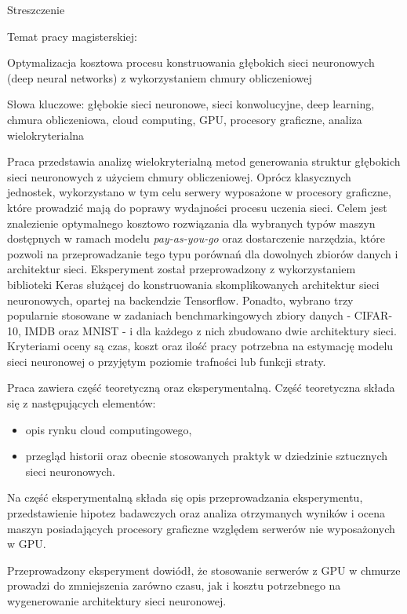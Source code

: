 \documentclass[12pt,a4paper,twoside]{article}
\begin{document}
\begin{center}

  {\Large Streszczenie}

  \vspace{1cm}
  {\large Temat pracy magisterskiej:}

  {\Large Optymalizacja kosztowa procesu konstruowania głębokich sieci neuronowych (deep neural networks) z wykorzystaniem chmury obliczeniowej}

  Słowa kluczowe:
  głębokie sieci neuronowe, sieci konwolucyjne, deep learning, chmura obliczeniowa, cloud computing, GPU, procesory graficzne, analiza wielokryterialna

  \end{center}
  \noindent
  Praca przedstawia analizę wielokryterialną metod generowania struktur głębokich sieci neuronowych z użyciem chmury obliczeniowej. Oprócz klasycznych jednostek, wykorzystano w tym celu serwery wyposażone w procesory graficzne, które prowadzić mają do poprawy wydajności procesu uczenia sieci. Celem jest znalezienie optymalnego kosztowo rozwiązania dla wybranych typów maszyn dostępnych w ramach modelu \textit{pay-as-you-go} oraz dostarczenie narzędzia, które pozwoli na przeprowadzanie tego typu porównań dla dowolnych zbiorów danych i architektur sieci. Eksperyment został przeprowadzony z wykorzystaniem biblioteki Keras służącej do konstruowania skomplikowanych architektur sieci neuronowych, opartej na backendzie Tensorflow. Ponadto, wybrano trzy popularnie stosowane w zadaniach benchmarkingowych zbiory danych - CIFAR-10, IMDB oraz MNIST - i dla każdego z nich zbudowano dwie architektury sieci. Kryteriami oceny są czas, koszt oraz ilość pracy potrzebna na estymację modelu sieci neuronowej o przyjętym poziomie trafności lub funkcji straty.

  Praca zawiera część teoretyczną oraz eksperymentalną. Część teoretyczna składa się z następujących elementów:
  \begin{itemize}
  \item opis rynku cloud computingowego,
  \item przegląd historii oraz obecnie stosowanych praktyk w dziedzinie sztucznych sieci neuronowych.
  \end{itemize}

  Na część eksperymentalną składa się opis przeprowadzania eksperymentu, przedstawienie hipotez badawczych oraz analiza otrzymanych wyników i ocena maszyn posiadających procesory graficzne względem serwerów nie wyposażonych w GPU.

  Przeprowadzony eksperyment dowiódł, że stosowanie serwerów z GPU w chmurze prowadzi do zmniejszenia zarówno czasu, jak i kosztu potrzebnego na wygenerowanie architektury sieci neuronowej.


\clearpage
\end{document}
